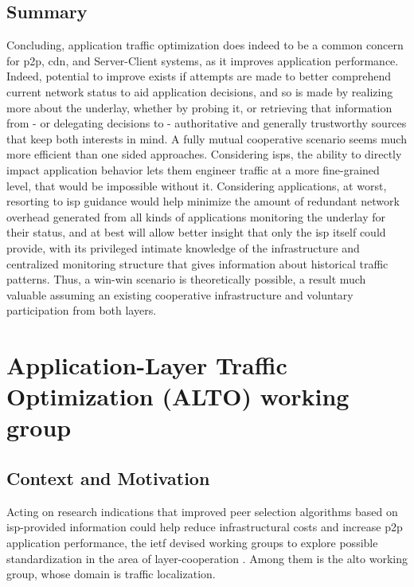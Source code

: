 \subsection{Summary}

    Concluding, application traffic optimization does indeed to be a common concern for \gls{p2p}, \gls{cdn}, and Server-Client systems, as it improves application performance.
    Indeed, potential to improve exists if attempts are made to better comprehend current network status to aid application decisions, and so is made by realizing more about the underlay, whether by probing it, or retrieving that information from - or delegating decisions to - authoritative and generally trustworthy sources that keep both interests in mind.
    A fully mutual cooperative scenario seems much more efficient than one sided approaches.
    Considering \glspl{isp}, the ability to directly impact application behavior lets them engineer traffic at a more fine-grained level, that would be impossible without it.
    Considering applications, at worst, resorting to \gls{isp} guidance would help minimize the amount of redundant network overhead generated from all kinds of applications monitoring the underlay for their status, and at best will allow better insight that only the \gls{isp} itself could provide, with its privileged intimate knowledge of the infrastructure and centralized monitoring structure that gives information about historical traffic patterns.
    Thus, a win-win scenario is theoretically possible, a result much valuable assuming an existing cooperative infrastructure and voluntary participation from both layers.

\section{Application-Layer Traffic Optimization (ALTO) working group}

\subsection{Context and Motivation}

    Acting on research indications that improved peer selection algorithms based on \gls{isp}-provided information could help reduce infrastructural costs and increase \gls{p2p} application performance, the \gls{ietf} devised working groups to explore possible standardization in the area of layer-cooperation \cite{seedorf2009}.
    Among them is the \gls{alto} working group, whose domain is traffic localization.

